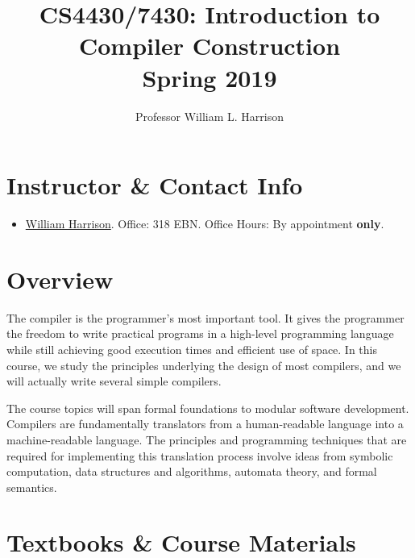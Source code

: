 \documentclass[11pt]{article}
\title{CS4430/7430: Introduction to Compiler Construction\\Spring 2019}
\author{Professor William L. Harrison}
\begin{document}
\maketitle

\section{Instructor \& Contact Info}

\begin{itemize}

\item  \href{mailto:harrisonwl@missouri.edu}{William Harrison}. Office: 318 EBN. Office Hours: By appointment {\bf only}.

\end{itemize}


\section{Overview}
The compiler is the programmer's most important tool. It gives the programmer the freedom to write practical programs in a high-level programming language while still achieving good execution times and efficient use of space. In this course, we study the principles underlying the design of most compilers, and we will actually write several simple compilers. 


The course topics will span formal foundations to modular software development. Compilers are fundamentally translators from a human-readable language into a machine-readable language. The principles and programming techniques that are required for implementing this translation process involve ideas from symbolic computation, data structures and algorithms, automata theory, and formal semantics.

\section{Textbooks \& Course Materials}
\end{document}
